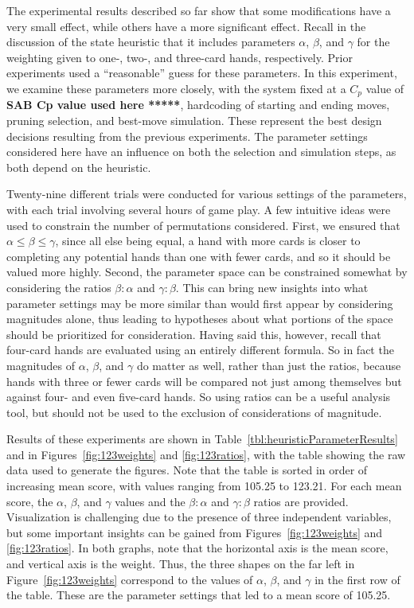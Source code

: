 \documentclass[letterpaper]{article}
\begin{document}
The experimental results described so far show that some modifications have a very small effect, while others have a more significant effect. Recall in the discussion of the state heuristic that it includes parameters $\alpha$, $\beta$, and $\gamma$ for the weighting given to one-, two-, and three-card hands, respectively. Prior experiments used a ``reasonable'' guess for these parameters. In this experiment, we examine these parameters more closely, with the system fixed at a $C_p$ value of {\bf SAB Cp value used here *****}, hardcoding of starting and ending moves, pruning selection, and best-move simulation. These represent the best design decisions resulting from the previous experiments. The parameter settings considered here have an influence on both the selection and simulation steps, as both depend on the heuristic.

Twenty-nine different trials were conducted for various settings of the parameters, with each trial involving several hours of game play. A few intuitive ideas were used to constrain the number of permutations considered. First, we ensured that $\alpha \leq \beta \leq \gamma$, since all else being equal, a hand with more cards is closer to completing any potential hands than one with fewer cards, and so it should be valued more highly. Second, the parameter space can be constrained somewhat by considering the ratios $\beta : \alpha$ and $\gamma : \beta$. This can bring new insights into what parameter settings may be more similar than would first appear by considering magnitudes alone, thus leading to hypotheses about what portions of the space should be prioritized for consideration. Having said this, however, recall that four-card hands are evaluated using an entirely different formula. So in fact the magnitudes of $\alpha$, $\beta$, and $\gamma$ do matter as well, rather than just the ratios, because hands with three or fewer cards will be compared not just among themselves but against four- and even five-card hands. So using ratios can be a useful analysis tool, but should not be used to the exclusion of considerations of magnitude.

Results of these experiments are shown in Table~\ref{tbl:heuristicParameterResults} and in Figures~\ref{fig:123weights} and \ref{fig:123ratios}, with the table showing the raw data used to generate the figures. Note that the table is sorted in order of increasing mean score, with values ranging from 105.25 to 123.21. For each mean score, the $\alpha$, $\beta$, and $\gamma$ values and the $\beta : \alpha$ and $\gamma : \beta$ ratios are provided. Visualization is challenging due to the presence of three independent variables, but some important insights can be gained from Figures~\ref{fig:123weights} and \ref{fig:123ratios}. In both graphs, note that the horizontal axis is the mean score, and vertical axis is the weight. Thus, the three shapes on the far left in Figure~\ref{fig:123weights} correspond to the values of $\alpha$, $\beta$, and $\gamma$ in the first row of the table. These are the parameter settings that led to a mean score of 105.25.
\end{document}
